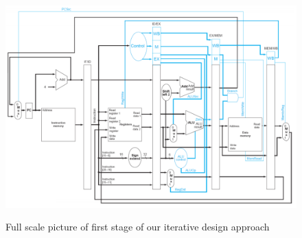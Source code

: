 \newpage\begin{figure}[h]
	\caption{Full scale picture of first stage of our iterative design approach}
	\includegraphics[scale=0.65, angle=90]{figures/design1.png}
	\label{fig:final-1-2-landscape}
\end{figure}
